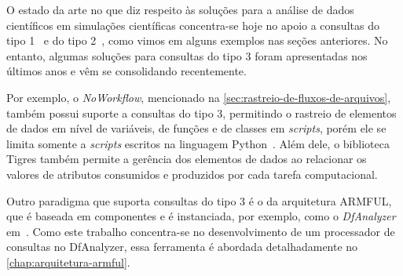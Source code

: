 O estado da arte no que diz respeito às soluções para a análise de dados científicos em simulações científicas concentra-se hoje no apoio a consultas do tipo 1~\cite{alagiannis2012nodb,karpathiotakis2014adaptive,wu2009fastbit,folk1999hdf5,silva2015propostadoutorado} e do tipo 2~\cite{murta2014noworkflow,mcphillips2015yesworkflow,hendrix2016tigres,Pimentel2016}, como vimos em alguns exemplos nas seções anteriores. No entanto, algumas soluções para consultas do tipo 3 foram apresentadas nos últimos anos e vêm se consolidando recentemente.

Por exemplo, o \textit{NoWorkflow}, mencionado na \autoref{sec:rastreio-de-fluxos-de-arquivos}, também possui suporte a consultas do tipo 3, permitindo o rastreio de elementos de dados em nível de variáveis, de funções e de classes em \textit{scripts}, porém ele se limita somente a \textit{scripts} escritos na linguagem Python~\cite{murta2014noworkflow}. Além dele, o biblioteca Tigres também permite a gerência dos elementos de dados ao relacionar os valores de atributos consumidos e produzidos por cada tarefa computacional.

Outro paradigma que suporta consultas do tipo 3 é o da arquitetura ARMFUL, que é baseada em componentes e é instanciada, por exemplo, como o \textit{DfAnalyzer} em~\cite{silva2017raw}. Como este trabalho concentra-se no desenvolvimento de um processador de consultas no DfAnalyzer, essa ferramenta é abordada detalhadamente no \autoref{chap:arquitetura-armful}.

